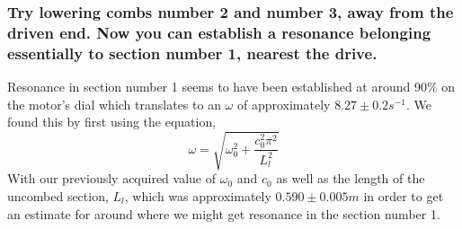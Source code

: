 \documentclass{article}
\begin{document}
\subsubsection*{Try lowering combs number 2 and number 3, away from the driven 
end.  Now you can establish a resonance belonging essentially to section number 1, 
nearest the drive.}
Resonance in section number 1 seems to have been established at around 90\% on 
the motor's dial which translates to an $\omega$ of approximately 
$8.27\pm0.2s^{-1}$.  We found this by first using the equation, 
\[\omega=\sqrt{\omega_{0}^2+\frac{c_{0}^2\pi^2}{L_l^2}}\]
With our previously acquired value of $\omega_{0}$ and $c_{0}$ as well as the
length of the uncombed section, $L_l$, which was approximately $0.590\pm0.005m$
in order to get an estimate for around where we might get resonance in the 
section number 1.
\end{document}
